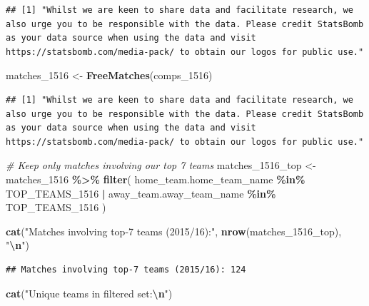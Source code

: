 \documentclass[
]{article}
\newenvironment{Shaded}{\begin{snugshade}}{\end{snugshade}}
\newcommand{\CommentTok}[1]{\textcolor[rgb]{0.56,0.35,0.01}{\textit{#1}}}
\newcommand{\FunctionTok}[1]{\textcolor[rgb]{0.13,0.29,0.53}{\textbf{#1}}}
\newcommand{\NormalTok}[1]{#1}
\newcommand{\OtherTok}[1]{\textcolor[rgb]{0.56,0.35,0.01}{#1}}
\newcommand{\SpecialCharTok}[1]{\textcolor[rgb]{0.81,0.36,0.00}{\textbf{#1}}}
\newcommand{\StringTok}[1]{\textcolor[rgb]{0.31,0.60,0.02}{#1}}
\begin{document}
\begin{verbatim}
## [1] "Whilst we are keen to share data and facilitate research, we also urge you to be responsible with the data. Please credit StatsBomb as your data source when using the data and visit https://statsbomb.com/media-pack/ to obtain our logos for public use."
\end{verbatim}

\begin{Shaded}
\begin{Highlighting}[]
\NormalTok{matches\_1516 }\OtherTok{\textless{}{-}} \FunctionTok{FreeMatches}\NormalTok{(comps\_1516)}
\end{Highlighting}
\end{Shaded}

\begin{verbatim}
## [1] "Whilst we are keen to share data and facilitate research, we also urge you to be responsible with the data. Please credit StatsBomb as your data source when using the data and visit https://statsbomb.com/media-pack/ to obtain our logos for public use."
\end{verbatim}

\begin{Shaded}
\begin{Highlighting}[]
\CommentTok{\# Keep only matches involving our top 7 teams}
\NormalTok{matches\_1516\_top }\OtherTok{\textless{}{-}}\NormalTok{ matches\_1516 }\SpecialCharTok{\%\textgreater{}\%}
  \FunctionTok{filter}\NormalTok{(}
\NormalTok{    home\_team.home\_team\_name }\SpecialCharTok{\%in\%}\NormalTok{ TOP\_TEAMS\_1516 }\SpecialCharTok{|}
\NormalTok{    away\_team.away\_team\_name }\SpecialCharTok{\%in\%}\NormalTok{ TOP\_TEAMS\_1516}
\NormalTok{  )}

\FunctionTok{cat}\NormalTok{(}\StringTok{"Matches involving top{-}7 teams (2015/16):"}\NormalTok{, }\FunctionTok{nrow}\NormalTok{(matches\_1516\_top), }\StringTok{"}\SpecialCharTok{\textbackslash{}n}\StringTok{"}\NormalTok{)}
\end{Highlighting}
\end{Shaded}

\begin{verbatim}
## Matches involving top-7 teams (2015/16): 124
\end{verbatim}

\begin{Shaded}
\begin{Highlighting}[]
\FunctionTok{cat}\NormalTok{(}\StringTok{"Unique teams in filtered set:}\SpecialCharTok{\textbackslash{}n}\StringTok{"}\NormalTok{)}
\end{Highlighting}
\end{Shaded}
\end{document}
